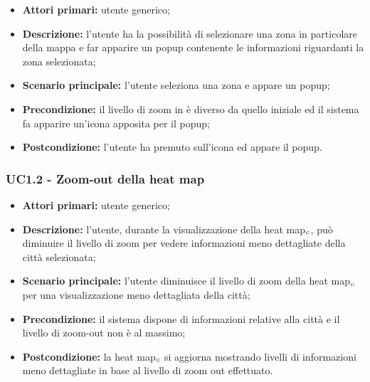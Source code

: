 \begin{itemize}
	\item \textbf{Attori primari:} utente generico;
	\item \textbf{Descrizione:} l’utente ha la possibilità di selezionare una zona in particolare della mappa e far apparire un popup contenente le informazioni riguardanti la zona selezionata;	
	\item \textbf{Scenario principale:} l’utente seleziona una zona e appare un popup;
	\item \textbf{Precondizione:} il livello di zoom in è diverso da quello iniziale ed il sistema fa apparire un’icona apposita per il popup;	
	\item \textbf{Postcondizione:} l’utente ha premuto sull’icona ed appare il popup.
\end{itemize}

\subsubsection{UC1.2 - Zoom-out della heat map}\label{CasiDUsoCasiDUsoTraUnUtenteEIlFrontEndElencoCasiDUsoUC12ZoomOutDellaHeatMap}

\begin{itemize}
	\item \textbf{Attori primari:} utente generico;
	\item \textbf{Descrizione:} l’utente, durante la visualizzazione della heat map$_{\scaleto{G}{3pt}}$, può diminuire il livello di zoom per vedere informazioni meno dettagliate della città selezionata;
	\item \textbf{Scenario principale:} l’utente diminuisce il livello di zoom della heat map$_{\scaleto{G}{3pt}}$ per una visualizzazione meno dettagliata della città;
	\item \textbf{Precondizione:}  il sistema dispone di informazioni relative alla città e il livello di zoom-out non è al massimo;
	\item \textbf{Postcondizione:} la heat map$_{\scaleto{G}{3pt}}$ si aggiorna mostrando livelli di informazioni meno dettagliate in base al livello di zoom out effettuato.
\end{itemize}

